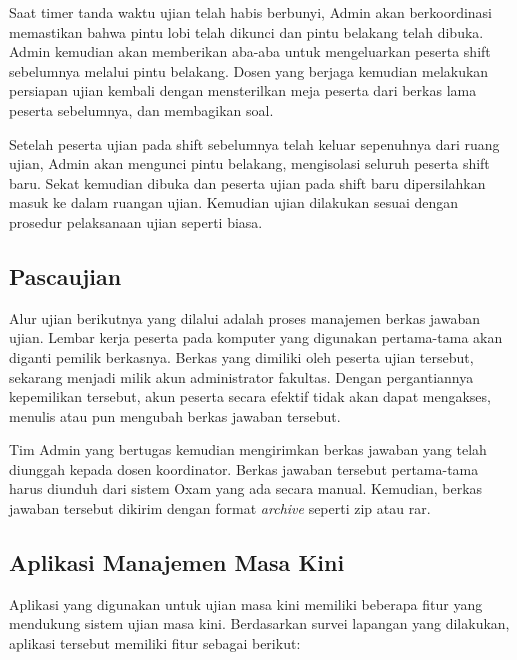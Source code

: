         Saat timer tanda waktu ujian telah habis berbunyi, Admin akan
        berkoordinasi memastikan bahwa pintu lobi telah dikunci dan pintu
        belakang telah dibuka. Admin kemudian akan memberikan aba-aba untuk
        mengeluarkan peserta shift sebelumnya melalui pintu belakang. Dosen yang
        berjaga kemudian melakukan persiapan ujian kembali dengan mensterilkan
        meja peserta dari berkas lama peserta sebelumnya, dan membagikan soal.
        
        Setelah peserta ujian pada shift sebelumnya telah keluar sepenuhnya dari
        ruang ujian, Admin akan mengunci pintu belakang, mengisolasi seluruh
        peserta shift baru. Sekat kemudian dibuka dan peserta ujian pada shift
        baru dipersilahkan masuk ke dalam ruangan ujian. Kemudian ujian
        dilakukan sesuai dengan prosedur pelaksanaan ujian seperti biasa.
    
    \subsection{Pascaujian}
        Alur ujian berikutnya yang dilalui adalah proses manajemen berkas
        jawaban ujian. Lembar kerja peserta pada komputer yang digunakan
        pertama-tama akan diganti pemilik berkasnya. Berkas yang dimiliki oleh
        peserta ujian tersebut, sekarang menjadi milik akun administrator
        fakultas. Dengan pergantiannya kepemilikan tersebut, akun peserta secara
        efektif tidak akan dapat mengakses, menulis atau pun mengubah berkas
        jawaban tersebut.
        
        Tim Admin yang bertugas kemudian mengirimkan berkas jawaban yang telah
        diunggah kepada dosen koordinator. Berkas jawaban tersebut pertama-tama
        harus diunduh dari sistem Oxam yang ada secara manual. Kemudian, berkas
        jawaban tersebut dikirim dengan format \textit{archive} seperti zip atau
        rar.

    \subsection{Aplikasi Manajemen Masa Kini}
        Aplikasi yang digunakan untuk ujian masa kini memiliki beberapa fitur
        yang mendukung sistem ujian masa kini. Berdasarkan survei lapangan yang
        dilakukan, aplikasi tersebut memiliki fitur sebagai berikut:
        
